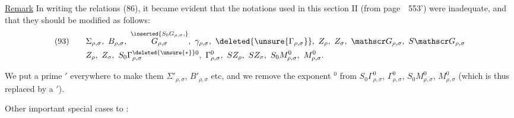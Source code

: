 \uline{Remark} In writing the relations (86), it became evident that the notations used in this section II (from page\ \ 553') were inadequate, and that they should be modified as follows:
\[
\begin{aligned}
(93)\qquad&\Sigma_{\rho,\sigma},\ B_{\rho,\sigma},\
\overset{\inserted{S_0G_{\rho,\sigma},}}{G_{\rho,\sigma}},\
\gamma_{\rho,\sigma},\ \deleted{\unsure{\Gamma_{\rho,\sigma}}},\
Z_\rho,\ Z_\sigma,\ \mathscr G_{\rho,\sigma},\ S\mathscr G_{\rho,\sigma}\\
&Z_\rho,\ Z_\sigma,\ S_0\Gamma_{\rho,\sigma}^{\deleted{\unsure{*}}0},\
\Gamma_{\rho,\sigma}^0,\ SZ_\rho,\ SZ_\sigma,\ S_0M_{\rho,\sigma}^0,\ M_{\rho,\sigma}^0.
\end{aligned}
\]

We put a prime $'$ everywhere to make them $\Sigma'_{\rho,\sigma}$, $B'_{\rho,\sigma}$ etc, and we remove the exponent $^0$ from $S_0\Gamma_{\rho,\sigma}^0$, $\Gamma_{\rho,\sigma}^0$, $S_0M_{\rho,\sigma}^0$, $M_{\rho,\sigma}^0$ (which is thus replaced by a $'$).

Other important special cases to :

